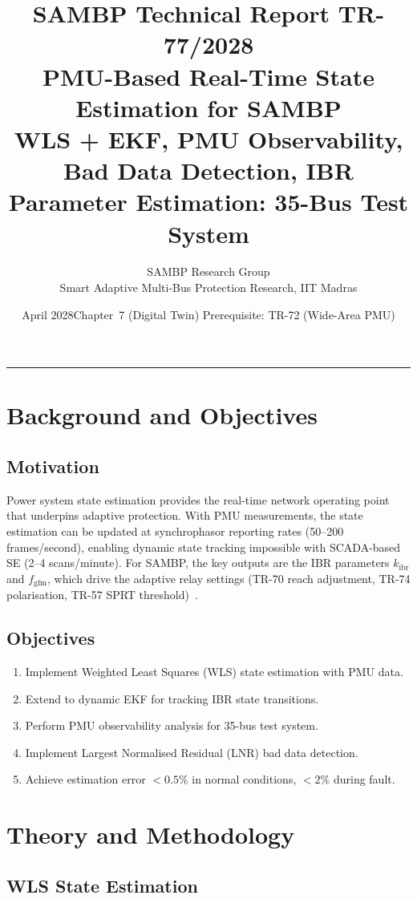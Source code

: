 \documentclass[11pt, a4paper]{article}
\title{\textbf{\textsf{\color{sambpblue}SAMBP Technical Report TR-77/2028}}\\[6pt]
  \Large PMU-Based Real-Time State Estimation for SAMBP\\[4pt]
  \normalsize WLS + EKF, PMU Observability, Bad Data Detection,
  IBR Parameter Estimation: 35-Bus Test System}
\author{SAMBP Research Group\\[2pt]
  \small Smart Adaptive Multi-Bus Protection Research, IIT Madras}
\date{April 2028\quad\textbar\quad Chapter~7 (Digital Twin)\quad\textbar\quad
  Prerequisite: TR-72 (Wide-Area PMU)}
\newcommand{\kibr}{k_{\mathrm{ibr}}}
\newcommand{\fgfm}{f_{\mathrm{gfm}}}
\begin{document}
\maketitle
\tableofcontents
\vspace{6pt}\hrule\vspace{10pt}

\section{Background and Objectives}
\label{sec:background}

\subsection{Motivation}

Power system state estimation provides the real-time network operating point
that underpins adaptive protection. With PMU measurements, the state estimation
can be updated at synchrophasor reporting rates (50--200 frames/second),
enabling dynamic state tracking impossible with SCADA-based SE (2--4 scans/minute).
For SAMBP, the key outputs are the IBR parameters $\kibr$ and $\fgfm$,
which drive the adaptive relay settings (TR-70 reach adjustment, TR-74
polarisation, TR-57 SPRT threshold)~\cite{Phadke2008}.

\subsection{Objectives}

\begin{enumerate}
  \item Implement Weighted Least Squares (WLS) state estimation with PMU data.
  \item Extend to dynamic EKF for tracking IBR state transitions.
  \item Perform PMU observability analysis for 35-bus test system.
  \item Implement Largest Normalised Residual (LNR) bad data detection.
  \item Achieve estimation error $< 0.5\%$ in normal conditions,
    $< 2\%$ during fault.
\end{enumerate}

\section{Theory and Methodology}
\label{sec:theory}

\subsection{WLS State Estimation}
\end{document}

